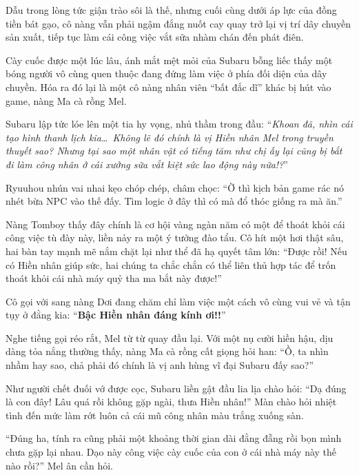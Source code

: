 \documentclass[../main.tex]{subfiles}
\begin{document}
Dẫu trong lòng tức giận trào sôi là thế, nhưng cuối cùng dưới áp lực của đồng tiền bát gạo, cô nàng vẫn phải ngậm đắng nuốt cay quay trở lại vị trí dây chuyền sản xuất, tiếp tục làm cái công việc vắt sữa nhàm chán đến phát điên.

\ct

Cày cuốc được một lúc lâu, ánh mắt mệt mỏi của Subaru bỗng liếc thấy một bóng người vô cùng quen thuộc đang đứng làm việc ở phía đối diện của dây chuyền. Hóa ra đó lại là một cô nàng nhân viên ``bất đắc dĩ'' khác bị hút vào game, nàng Ma cà rồng Mel.

Subaru lập tức lóe lên một tia hy vọng, nhủ thầm trong đầu: ``\textit{Khoan đã, nhìn cái tạo hình thanh lịch kia\dots\ Không lẽ đó chính là vị Hiền nhân Mel trong truyền thuyết sao? Nhưng tại sao một nhân vật có tiếng tăm như chị ấy lại cũng bị bắt đi làm công nhân ở cái xưởng sữa vắt kiệt sức lao động này nữa!?}''


\il

Ryuuhou nhún vai nhai kẹo chóp chép, châm chọc: ``Ờ thì kịch bản game rác nó nhét bừa NPC vào thế đấy. Tìm logic ở đây thì có mà đổ thóc giống ra mà ăn.''

\il

Nàng Tomboy thấy đây chính là cơ hội vàng ngàn năm có một để thoát khỏi cái công việc tù đày này, liền nảy ra một ý tưởng đào tẩu. Cô hít một hơi thật sâu, hai bàn tay mạnh mẽ nắm chặt lại như thể đã hạ quyết tâm lớn: ``Được rồi! Nếu có Hiền nhân giúp sức, hai chúng ta chắc chắn có thể liên thủ hợp tác để trốn thoát khỏi cái nhà máy quỷ tha ma bắt này được!''

Cô gọi với sang nàng Dơi đang chăm chỉ làm việc một cách vô cùng vui vẻ và tận tụy ở đằng kia: ``\textbf{Bậc Hiền nhân đáng kính ơi!!}''

Nghe tiếng gọi réo rắt, Mel từ từ quay đầu lại. Với một nụ cười hiền hậu, dịu dàng tỏa nắng thường thấy, nàng Ma cà rồng cất giọng hỏi han: ``Ồ, ta nhìn nhầm hay sao, chả phải đó chính là vị anh hùng vĩ đại Subaru đấy sao?''

Như người chết đuối vớ được cọc, Subaru liền gật đầu lia lịa chào hỏi: ``Dạ đúng là con đây! Lâu quá rồi không gặp ngài, thưa Hiền nhân!'' Màn chào hỏi nhiệt tình đến mức làm rớt luôn cả cái mũ công nhân màu trắng xuống sàn.

``Đúng ha, tính ra cũng phải một khoảng thời gian dài đằng đẵng rồi bọn mình chưa gặp lại nhau. Dạo này công việc cày cuốc của con ở cái nhà máy này thế nào rồi?'' Mel ân cần hỏi.
\end{document}
